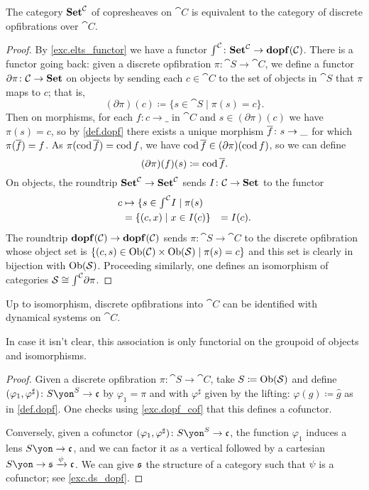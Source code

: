 \documentclass[Book-Poly]{subfiles}
\begin{document}
\begin{proposition}\label{prop.tfae_dopf}
The category $\mathbf{Set}^{\mathcal{C}}$ of copresheaves on $\cat{C}$ is equivalent to the category of discrete opfibrations over $\cat{C}$.
\end{proposition}
\begin{proof}
By \cref{exc.elts_functor} we have a functor $\textstyle{\int}^{\mathcal{C}}\colon\mathbf{Set}^{\mathcal{C}}\to\mathbf{dopf}(\mathcal{C})$. There is a functor going back: given a discrete opfibration $\pi\colon\cat{S}\to\cat{C}$, we define a functor $\partial\pi\colon\mathcal{C}\to\mathbf{Set}$ on objects by sending each $c\in\cat{C}$ to the set of objects in $\cat{S}$ that $\pi$ maps to $c$; that is,
\[
    (\partial\pi)(c)\coloneqq\{s\in\cat{S}\mid\pi(s)=c\}.
\]
Then on morphisms, for each $f\colon c\to\_$ in $\cat{C}$ and $s\in(\partial\pi)(c)$ we have $\pi(s)=c$, so by \cref{def.dopf} there exists a unique morphism $\overline{f}\colon s\to\_$ for which $\pi(\overline{f})=f$.
As $\pi(\operatorname{cod}\overline{f})=\operatorname{cod} f$, we have $\operatorname{cod}\overline{f}\in(\partial\pi)(\operatorname{cod} f)$, so we can define
\[
    (\partial\pi)(f)(s)\coloneqq\operatorname{cod}\overline{f}.
\]
On objects, the roundtrip $\mathbf{Set}^{\mathcal{C}}\to\mathbf{Set}^{\mathcal{C}}$ sends $I\colon\mathcal{C}\to\mathbf{Set}$ to the functor
\begin{align*}
	c&
	\mapsto\{s\in\textstyle{\int}^{\mathcal{C}}I\mid \pi(s)\\&
	=\{(c,x)\mid x\in I(c)\}&=I(c).
\end{align*}
The roundtrip $\mathbf{dopf}(\mathcal{C})\to\mathbf{dopf}(\mathcal{C})$ sends $\pi\colon\cat{S}\to\cat{C}$ to the discrete opfibration whose object set is $\{(c,s)\in\operatorname{Ob}(\mathcal{C})\times\operatorname{Ob}(\mathcal{S})\mid\pi(s)=c\}$ and this set is clearly in bijection with $\operatorname{Ob}(\mathcal{S})$. Proceeding similarly, one defines an isomorphism of categories $\mathcal{S}\cong\textstyle{\int}^{\mathcal{C}}\partial\pi$.
\end{proof}


\begin{proposition}\label{prop.ds_dopf}
Up to isomorphism, discrete opfibrations into $\cat{C}$ can be identified with dynamical systems on $\cat{C}$.
\end{proposition}
In case it isn't clear, this association is only functorial on the groupoid of objects and isomorphisms.
\begin{proof}
Given a discrete opfibration $\pi\colon\cat{S}\to\cat{C}$, take $S\coloneqq\operatorname{Ob}(\mathcal{S})$ and define $(\varphi_1,\varphi^\sharp)\colon S\yon^S\to\car{c}$ by $\varphi_1=\pi$ and with $\varphi^\sharp$ given by the lifting: $\varphi(g)\coloneqq \hat{g}$ as in \cref{def.dopf}. One checks using \cref{exc.dopf_cof} that this defines a cofunctor.

Conversely, given a cofunctor $(\varphi_1,\varphi^\sharp)\colon S\yon^S\to\car{c}$, the function $\varphi_1$ induces a lens $S\yon\to\car{c}$, and we can factor it as a vertical followed by a cartesian $S\yon\to\car{s}\To{\psi}\car{c}$. We can give $\mathfrak{s}$ the structure of a category such that $\psi$ is a cofunctor; see \cref{exc.ds_dopf}.
\end{proof}
\end{document}
